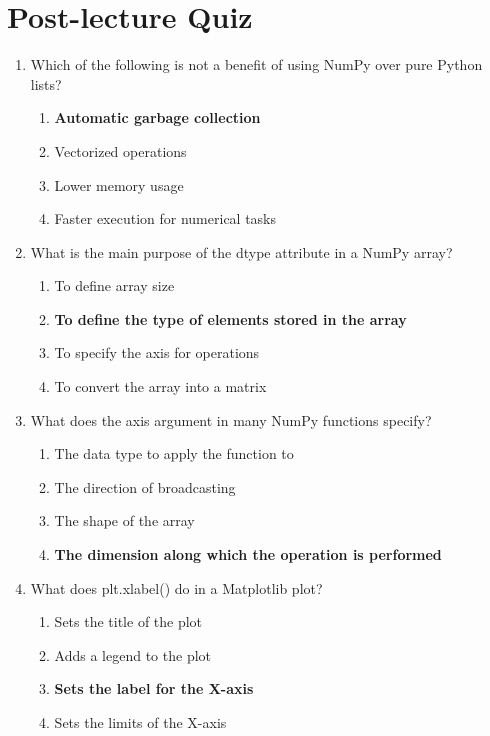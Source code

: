 \newpage

\section{Post-lecture Quiz}

\begin{enumerate}
    \item Which of the following is not a benefit of using NumPy over pure
          Python lists?
    \begin{enumerate}
        \item \textbf{Automatic garbage collection}
        \item Vectorized operations
        \item Lower memory usage
        \item Faster execution for numerical tasks
    \end{enumerate}

    \item What is the main purpose of the dtype attribute in a NumPy array?
    \begin{enumerate}
        \item To define array size
        \item \textbf{To define the type of elements stored in the array}
        \item To specify the axis for operations
        \item To convert the array into a matrix
    \end{enumerate}

    \item What does the axis argument in many NumPy functions specify?
    \begin{enumerate}
        \item The data type to apply the function to
        \item The direction of broadcasting
        \item The shape of the array
        \item \textbf{The dimension along which the operation is performed}
    \end{enumerate}

    \item What does plt.xlabel() do in a Matplotlib plot?
    \begin{enumerate}
        \item Sets the title of the plot
        \item Adds a legend to the plot
        \item \textbf{Sets the label for the X-axis}
        \item Sets the limits of the X-axis
    \end{enumerate}


\end{enumerate}
